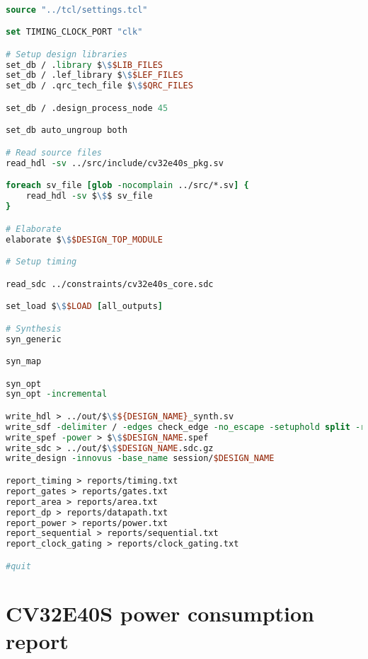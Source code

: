 \begin{lstlisting}[caption={TCL script for synthesizing designs and generating reports.}, label=lst:tcl, language=tcl]

source "../tcl/settings.tcl"

set TIMING_CLOCK_PORT "clk"

# Setup design libraries
set_db / .library $\$$LIB_FILES
set_db / .lef_library $\$$LEF_FILES
set_db / .qrc_tech_file $\$$QRC_FILES

set_db / .design_process_node 45

set_db auto_ungroup both

# Read source files
read_hdl -sv ../src/include/cv32e40s_pkg.sv

foreach sv_file [glob -nocomplain ../src/*.sv] {
	read_hdl -sv $\$$ sv_file
}

# Elaborate
elaborate $\$$DESIGN_TOP_MODULE

# Setup timing

read_sdc ../constraints/cv32e40s_core.sdc

set_load $\$$LOAD [all_outputs]

# Synthesis
syn_generic

syn_map

syn_opt
syn_opt -incremental

write_hdl > ../out/$\$${DESIGN_NAME}_synth.sv
write_sdf -delimiter / -edges check_edge -no_escape -setuphold split -recrem split > $\$$DESIGN_NAME.sdf.gz
write_spef -power > $\$$DESIGN_NAME.spef
write_sdc > ../out/$\$$DESIGN_NAME.sdc.gz
write_design -innovus -base_name session/$DESIGN_NAME

report_timing > reports/timing.txt
report_gates > reports/gates.txt
report_area > reports/area.txt
report_dp > reports/datapath.txt
report_power > reports/power.txt
report_sequential > reports/sequential.txt
report_clock_gating > reports/clock_gating.txt

#quit
\end{lstlisting}

\section{CV32E40S power consumption report}
\label{app:sc_pow}

